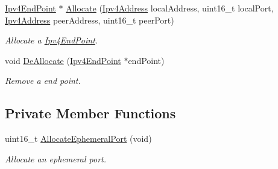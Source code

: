 \begin{DoxyCompactItemize}
\hyperlink{classns3_1_1Ipv4EndPoint}{Ipv4\+End\+Point} $\ast$ \hyperlink{classns3_1_1Ipv4EndPointDemux_a4af1e2d48f1b8d0a313b4949dc573f29}{Allocate} (\hyperlink{classns3_1_1Ipv4Address}{Ipv4\+Address} local\+Address, uint16\+\_\+t local\+Port, \hyperlink{classns3_1_1Ipv4Address}{Ipv4\+Address} peer\+Address, uint16\+\_\+t peer\+Port)
\begin{DoxyCompactList}\small\item\em Allocate a \hyperlink{classns3_1_1Ipv4EndPoint}{Ipv4\+End\+Point}. \end{DoxyCompactList}\item 
void \hyperlink{classns3_1_1Ipv4EndPointDemux_aef987a05ce248887200d14525b8daaec}{De\+Allocate} (\hyperlink{classns3_1_1Ipv4EndPoint}{Ipv4\+End\+Point} $\ast$end\+Point)
\begin{DoxyCompactList}\small\item\em Remove a end point. \end{DoxyCompactList}\end{DoxyCompactItemize}
\subsection*{Private Member Functions}
\begin{DoxyCompactItemize}
\item 
uint16\+\_\+t \hyperlink{classns3_1_1Ipv4EndPointDemux_a5ae0acd03c077458051f13118e0dcae6}{Allocate\+Ephemeral\+Port} (void)
\begin{DoxyCompactList}\small\item\em Allocate an ephemeral port. \end{DoxyCompactList}\end{DoxyCompactItemize}
